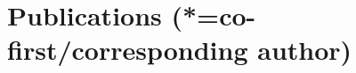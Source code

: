 \documentclass[11pt]{article}
\begin{document}





  \section{Publications {\small (*=co-first/corresponding author)}}
  
\end{document}
